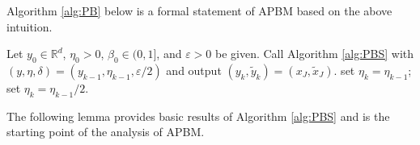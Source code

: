 \documentclass[11pt,letterpaper]{article}
\newcommand{\R}{\mathbb{R}}
\begin{document}
Algorithm \ref{alg:PB} below is a formal statement of APBM based on the above intuition.

\begin{algorithm}[H]
	\caption{Adaptive Proximal Bundle Method} 
	\label{alg:PB}
	\begin{algorithmic}
	\REQUIRE Let $y_0\in \R^d$, $\eta_0>0$, $\beta_0\in(0,1]$, and $\varepsilon>0$  be given.
        \STATE 
		Call Algorithm \ref{alg:PBS} with $(y,\eta,\delta)=(y_{k-1},\eta_{k-1},\varepsilon/2)$ and output $(y_k,\tilde y_k)=(x_J,\tilde x_J)$.
            \STATE set $\eta_k=\eta_{k-1}$;
        \ELSE
            \STATE set $\eta_k=\eta_{k-1}/2$.
        \ENDIF
        \ENDFOR
	\end{algorithmic}
\end{algorithm}

The following lemma provides basic results of Algorithm \ref{alg:PBS} and is the starting point of the analysis of APBM.
\end{document}
